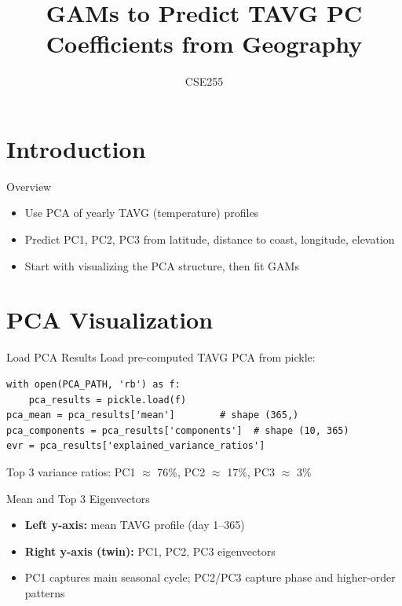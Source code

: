 \documentclass{beamer}
\title{GAMs to Predict TAVG PC Coefficients from Geography}
\author{CSE255}
\institute{}
\date{}
\begin{document}
\begin{frame}
\titlepage
\end{frame}

\section{Introduction}

\begin{frame}{Overview}
\begin{itemize}
\item Use PCA of yearly TAVG (temperature) profiles
\item Predict PC1, PC2, PC3 from latitude, distance to coast, longitude, elevation
\item Start with visualizing the PCA structure, then fit GAMs
\end{itemize}
\end{frame}

\section{PCA Visualization}

\begin{frame}{Load PCA Results}
Load pre-computed TAVG PCA from pickle:
\begin{lstlisting}
with open(PCA_PATH, 'rb') as f:
    pca_results = pickle.load(f)
pca_mean = pca_results['mean']        # shape (365,)
pca_components = pca_results['components']  # shape (10, 365)
evr = pca_results['explained_variance_ratios']
\end{lstlisting}
\vspace{0.3em}
Top 3 variance ratios: PC1 $\approx$ 76\%, PC2 $\approx$ 17\%, PC3 $\approx$ 3\%
\end{frame}

\begin{frame}{Mean and Top 3 Eigenvectors}
\begin{itemize}
\item \textbf{Left y-axis:} mean TAVG profile (day 1--365)
\item \textbf{Right y-axis (twin):} PC1, PC2, PC3 eigenvectors
\item PC1 captures main seasonal cycle; PC2/PC3 capture phase and higher-order patterns
\end{itemize}
\vspace{0.3em}
\end{frame}
\end{document}
